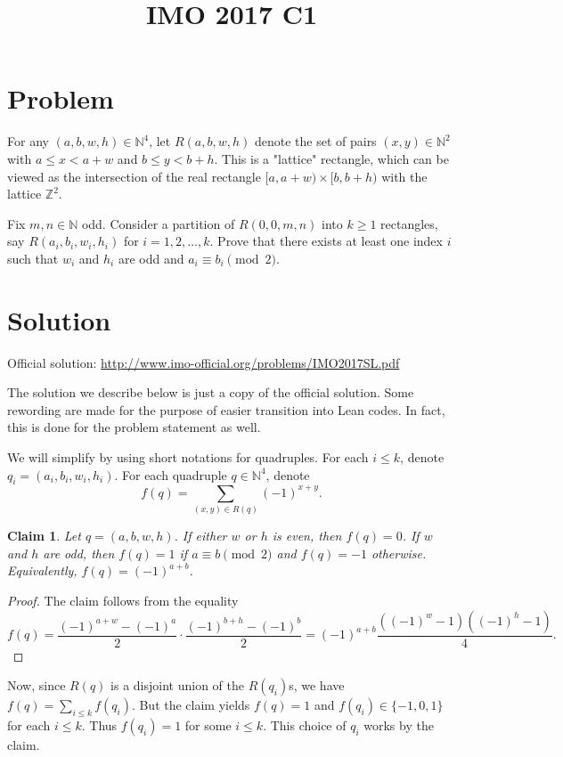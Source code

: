 \documentclass{article}
\title{IMO 2017 C1}
\author{}
\date{}
\newcommand{\N}{\mathbb{N}}
\newcommand{\Z}{\mathbb{Z}}
\newtheorem*{claim}{Claim}
\begin{document}
\maketitle



\section*{Problem}

For any $(a, b, w, h) \in \N^4$, let $R(a, b, w, h)$ denote the set of pairs $(x, y) \in \N^2$ with $a \leq x < a + w$ and $b \leq y < b + h$.
This is a "lattice" rectangle, which can be viewed as the intersection of the real rectangle $[a, a + w) \times [b, b + h)$ with the lattice $\Z^2$.

Fix $m, n \in \N$ odd.
Consider a partition of $R(0, 0, m, n)$ into $k \geq 1$ rectangles, say $R(a_i, b_i, w_i, h_i)$ for $i = 1, 2, \ldots, k$.
Prove that there exists at least one index $i$ such that $w_i$ and $h_i$ are odd and $a_i \equiv b_i \pmod{2}$.



\section*{Solution}

Official solution: \url{http://www.imo-official.org/problems/IMO2017SL.pdf}

The solution we describe below is just a copy of the official solution.
Some rewording are made for the purpose of easier transition into Lean codes.
In fact, this is done for the problem statement as well.

We will simplify by using short notations for quadruples.
For each $i \leq k$, denote $q_i = (a_i, b_i, w_i, h_i)$.
For each quadruple $q \in \N^4$, denote
\[ f(q) = \sum_{(x, y) \in R(q)} (-1)^{x + y}. \]

\begin{claim}
Let $q = (a, b, w, h)$.
If either $w$ or $h$ is even, then $f(q) = 0$.
If $w$ and $h$ are odd, then $f(q) = 1$ if $a \equiv b \pmod{2}$ and $f(q) = -1$ otherwise.
Equivalently, $f(q) = (-1)^{a + b}$.
\end{claim}
\begin{proof}
The claim follows from the equality
\[ f(q) = \frac{(-1)^{a + w} - (-1)^a}{2} \cdot \frac{(-1)^{b + h} - (-1)^b}{2} = (-1)^{a + b}\frac{((-1)^w - 1)((-1)^h - 1)}{4}. \]
\end{proof}

Now, since $R(q)$ is a disjoint union of the $R(q_i)$s, we have $f(q) = \sum_{i \leq k} f(q_i)$.
But the claim yields $f(q) = 1$ and $f(q_i) \in \{-1, 0, 1\}$ for each $i \leq k$.
Thus $f(q_i) = 1$ for some $i \leq k$.
This choice of $q_i$ works by the claim.
\end{document}

